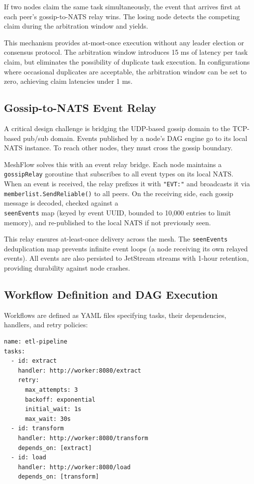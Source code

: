 \documentclass[sigconf]{acmart}
\begin{document}
If two nodes claim the same task simultaneously, the event that arrives first at each peer's gossip-to-NATS relay wins. The losing node detects the competing claim during the arbitration window and yields.

This mechanism provides at-most-once execution without any leader election or consensus protocol. The arbitration window introduces 15 ms of latency per task claim, but eliminates the possibility of duplicate task execution. In configurations where occasional duplicates are acceptable, the arbitration window can be set to zero, achieving claim latencies under 1 ms.

\subsection{Gossip-to-NATS Event Relay}

A critical design challenge is bridging the UDP-based gossip domain to the TCP-based pub/sub domain. Events published by a node's DAG engine go to its local NATS instance. To reach other nodes, they must cross the gossip boundary.

MeshFlow solves this with an event relay bridge. Each node maintains a \texttt{gossipRelay} goroutine that subscribes to all event types on its local NATS. When an event is received, the relay prefixes it with \texttt{"EVT:"} and broadcasts it via \\ \texttt{memberlist.SendReliable()} to all peers. On the receiving side, each gossip message is decoded, checked against a \\ \texttt{seenEvents} map (keyed by event UUID, bounded to 10,000 entries to limit memory), and re-published to the local NATS if not previously seen.

This relay ensures at-least-once delivery across the mesh. The \texttt{seenEvents} deduplication map prevents infinite event loops (a node receiving its own relayed events). All events are also persisted to JetStream streams with 1-hour retention, providing durability against node crashes.

\subsection{Workflow Definition and DAG Execution}

Workflows are defined as YAML files specifying tasks, their dependencies, handlers, and retry policies:

\begin{lstlisting}[basicstyle=\small\ttfamily, frame=single]
name: etl-pipeline
tasks:
  - id: extract
    handler: http://worker:8080/extract
    retry:
      max_attempts: 3
      backoff: exponential
      initial_wait: 1s
      max_wait: 30s
  - id: transform
    handler: http://worker:8080/transform
    depends_on: [extract]
  - id: load
    handler: http://worker:8080/load
    depends_on: [transform]
\end{lstlisting}
\end{document}
